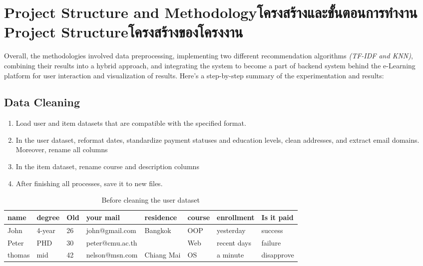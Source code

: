 \chapter{\ifproject%
\ifenglish Project Structure and Methodology\else โครงสร้างและขั้นตอนการทำงาน\fi
\else%
\ifenglish Project Structure\else โครงสร้างของโครงงาน\fi
\fi
}

Overall, the methodologies involved data preprocessing, implementing 
two different recommendation algorithms \textit{(TF-IDF and KNN)}, 
combining their results into a hybrid approach, and integrating 
the system to become a part of backend system behind the e-Learning 
platform for user interaction and visualization of results. 
Here's a step-by-step summary of the experimentation and results:

\makeatletter

\section{Data Cleaning}
\begin{enumerate}
    \item \textsf{Load user and item datasets that are compatible with the specified format.}
    \item \textsf{In the user dataset, reformat dates, standardize payment statuses and education 
    levels, clean addresses, and extract email domains. Moreover, rename all columns}
    \item \textsf{In the item dataset, rename course and description columns}
    \item \textsf{After finishing all processes, save it to new files.}
\end{enumerate}

\begin{table}[htbp]
\center
\small
\begin{tabular}{p{1.1cm}p{1cm}p{0.5cm}p{2.5cm}p{1.75cm}p{1cm}p{1.75cm}p{1.7cm}} %
    \toprule
    \textbf{name} & \textbf{degree} & \textbf{Old}   & \textbf{your mail} & \textbf{residence}  & \textbf{course} & \textbf{enrollment} & \textbf{Is it paid} \\
    \midrule
    John       & 4-year     & 26           & john@gmail.com    & Bangkok & OOP  & yesterday     & success  \\
    Peter         & PHD        & 30     & peter@cmu.ac.th  &  &  Web & recent days    & failure \\
    thomas      & mid        & 42    & nelson@msn.com  & Chiang Mai & OS& a minute    & disapprove  \\
    \bottomrule
\end{tabular}
\caption{Before cleaning the user dataset}
\end{table}

